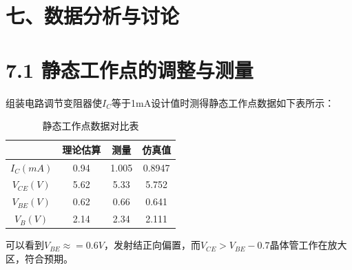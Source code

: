 \documentclass[12pt,a4paper]{article}
\begin{document}
\section*{七、数据分析与讨论}
\section*{7.1 静态工作点的调整与测量}
组装电路调节变阻器使$I_C$等于1mA设计值时测得静态工作点数据如下表所示：
\begin{table}[H]
\centering
\begin{tabular}{|c|c|c|c|}
\hline
 & 理论估算 & 测量 &仿真值 \\
\hline
$I_C(mA)$ &0.94 & 1.005 & 0.8947 \\
\hline
$V_{CE}(V)$ & 5.62 & 5.33 & 5.752\\
\hline
$V_{BE}(V)$ & 0.62 & 0.66 & 0.641\\
\hline
$V_B(V)$ & 2.14 & 2.34 & 2.111 \\
\hline
\end{tabular}
\caption{静态工作点数据对比表}
\end{table}
可以看到$V_{BE} \approx =0.6V$，发射结正向偏置，而$V_{CE}>V_{BE}-0.7$晶体管工作在放大区，符合预期。
\end{document}
